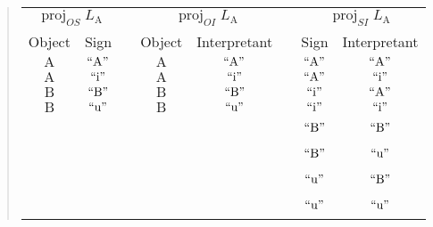 \documentclass[12pt]{article}
\begin{document}
\begin{quote}\begin{tabular}{|c|c|p{1cm}|c|c|p{1cm}|c|c|}
\multicolumn{2}{c}{$\operatorname{proj}_{OS}L_{\mathrm{A}}$} &
\multicolumn{1}{c}{ } &
\multicolumn{2}{c}{$\operatorname{proj}_{OI}L_{\mathrm{A}}$} &
\multicolumn{1}{c}{ } &
\multicolumn{2}{c}{$\operatorname{proj}_{SI}L_{\mathrm{A}}$} \\
\cline{1-2}\cline{4-5}\cline{7-8}
Object & Sign & & Object & Interpretant & & Sign & Interpretant \\
\cline{1-2}\cline{4-5}\cline{7-8}
$\mathrm{A}$ & $\mathrm{``A"}$ & &
$\mathrm{A}$ & $\mathrm{``A"}$ & &
$\mathrm{``A"}$ & $\mathrm{``A"}$ \\
\cline{1-2}\cline{4-5}\cline{7-8}
$\mathrm{A}$ & $\mathrm{``i"}$ & &
$\mathrm{A}$ & $\mathrm{``i"}$ & &
$\mathrm{``A"}$ & $\mathrm{``i"}$ \\
\cline{1-2}\cline{4-5}\cline{7-8}
$\mathrm{B}$ & $\mathrm{``B"}$ & &
$\mathrm{B}$ & $\mathrm{``B"}$ & &
$\mathrm{``i"}$ & $\mathrm{``A"}$ \\
\cline{1-2}\cline{4-5}\cline{7-8}
$\mathrm{B}$ & $\mathrm{``u"}$ & &
$\mathrm{B}$ & $\mathrm{``u"}$ & &
$\mathrm{``i"}$ & $\mathrm{``i"}$ \\
\cline{1-2}\cline{4-5}\cline{7-8}
\multicolumn{6}{c|}{~} & $\mathrm{``B"}$ & $\mathrm{``B"}$ \\
\cline{7-8}
\multicolumn{6}{c|}{~} & $\mathrm{``B"}$ & $\mathrm{``u"}$ \\
\cline{7-8}
\multicolumn{6}{c|}{~} & $\mathrm{``u"}$ & $\mathrm{``B"}$ \\
\cline{7-8}
\multicolumn{6}{c|}{~} & $\mathrm{``u"}$ & $\mathrm{``u"}$ \\
\cline{7-8}
\end{tabular}\end{quote}
\end{document}
